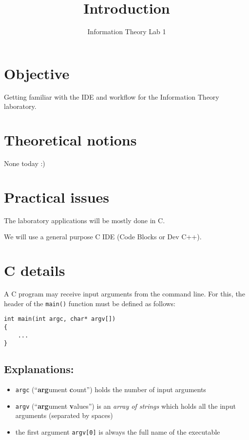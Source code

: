 \documentclass[12pt,]{scrartcl}
\title{Introduction}
\subtitle{Information Theory Lab 1}
\date{}
\providecommand{\tightlist}{%
  \setlength{\itemsep}{0pt}\setlength{\parskip}{0pt}}
\begin{document}
\maketitle

\section{Objective}\label{objective}

Getting familiar with the IDE and workflow for the Information Theory
laboratory.

\section{Theoretical notions}\label{theoretical-notions}

None today :)

\section{Practical issues}\label{practical-issues}

The laboratory applications will be mostly done in C.

We will use a general purpose C IDE (Code Blocks or Dev C++).

\section{C details}\label{c-details}

A C program may receive input arguments from the command line. For this,
the header of the \texttt{main()} function must be defined as follows:

\begin{verbatim}
int main(int argc, char* argv[])
{
    ...
}
\end{verbatim}

\subsection{Explanations:}\label{explanations}

\begin{itemize}
\tightlist
\item
  \texttt{argc} (``\textbf{arg}ument \textbf{c}ount'') holds the number
  of input arguments
\item
  \texttt{argv} (``\textbf{arg}ument \textbf{v}alues'') is an
  \emph{array of strings} which holds all the input arguments (separated
  by spaces)
\item
  the first argument \texttt{argv{[}0{]}} is always the full name of the
  executable
\end{itemize}
\end{document}
